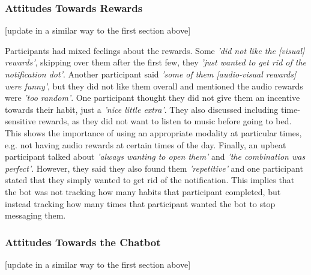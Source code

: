 \documentclass{scaffold/sigchi}
\begin{document}
\subsubsection{Attitudes Towards Rewards}
[update in a similar way to the first section above]

Participants had mixed feelings about the rewards. Some \textit{'did not like the [visual] rewards'}, skipping over them after the first few, they \textit{'just wanted to get rid of the notification dot'}. Another participant said \textit{'some of them [audio-visual rewards] were funny'}, but they did not like them overall and mentioned the audio rewards were \textit{'too random'}. One participant thought they did not give them an incentive towards their habit, just a \textit{'nice little extra'}. They also discussed including time-sensitive rewards, as they did not want to listen to music before going to bed. This shows the importance of using an appropriate modality at particular times, e.g. not having audio rewards at certain times of the day. Finally, an upbeat participant talked about \textit{'always wanting to open them'} and \textit{'the combination was perfect'}. However, they said they also found them \textit{'repetitive'} and one participant stated that they simply wanted to get rid of the notification. This implies that the bot was not tracking how many habits that participant completed, but instead tracking how many times that participant wanted the bot to stop messaging them.

\subsubsection{Attitudes Towards the Chatbot}
[update in a similar way to the first section above]
\end{document}
